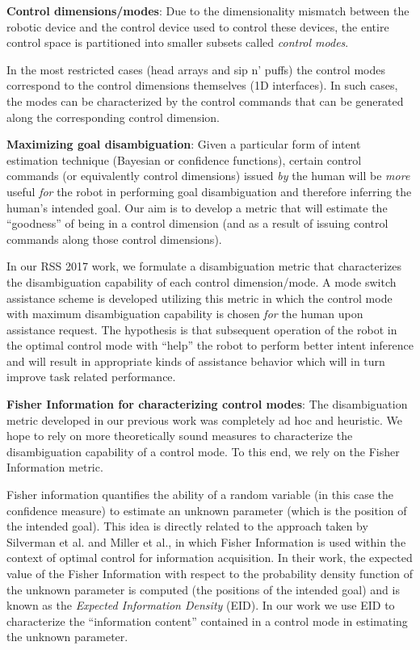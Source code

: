 \documentclass[]{article}
\begin{document}
\noindent \textbf{Control dimensions/modes}: Due to the dimensionality mismatch between the robotic device and the control device used to control these devices, the entire control space is partitioned into smaller subsets called \textit{control modes}. 

In the most restricted cases (head arrays and sip n' puffs) the control modes correspond to the control dimensions themselves (1D interfaces). In such cases, the modes can be characterized by the control commands that can be generated along the corresponding control dimension. 

\noindent\textbf{Maximizing goal disambiguation}: Given a particular form of intent estimation technique (Bayesian or confidence functions), certain control commands (or equivalently control dimensions) issued \textit{by} the human will be \textit{more} useful \textit{for} the robot in performing goal disambiguation and therefore inferring the human's intended goal. Our aim is to develop a metric that will estimate the ``goodness'' of being in a control dimension (and as a result of issuing control commands along those control dimensions). 

In our RSS 2017 work, we formulate a disambiguation metric that characterizes the disambiguation capability of each control dimension/mode. A mode switch assistance scheme is developed utilizing this metric in which the control mode with maximum disambiguation capability is chosen \textit{for} the human upon assistance request. The hypothesis is that subsequent operation of the robot in the optimal control mode with ``help'' the robot to perform better intent inference and will result in appropriate kinds of assistance behavior which will in turn improve task related performance. 

\noindent \textbf{Fisher Information for characterizing control modes}: The disambiguation metric developed in our previous work was completely ad hoc and heuristic. We hope to rely on more theoretically sound measures to characterize the disambiguation capability of a control mode. To this end, we rely on the Fisher Information metric. 

Fisher information quantifies the ability of a random variable (in this case the confidence measure) to estimate an unknown parameter (which is the position of the intended goal). This idea is directly related to the approach taken by Silverman et al. and Miller et al., in which Fisher Information is used within the context of optimal control for information acquisition. In their work, the expected value of the Fisher Information with respect to the probability density function of the unknown parameter is computed (the positions of the intended goal) and is known as the \textit{Expected Information Density} (EID). In our work we use EID to characterize the ``information content'' contained in a control mode  in estimating the unknown parameter. 
\end{document}

